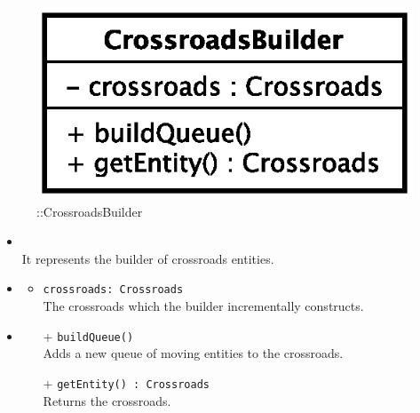 \begin{figure}[h]
\centering
\includegraphics[scale=0.6,keepaspectratio]{images/solution/app/backend/crossroads_builder.eps}
\caption{\pReactiveBuild::CrossroadsBuilder}
\label{fig:sd-app-crossroads_builder}
\end{figure}
\FloatBarrier
\begin{itemize}
  \item \textbf{\descr} \\
    It represents the builder of crossroads entities. 
    \item \textbf{\attrs}
  \begin{itemize}
    \item \texttt{crossroads: Crossroads} \\
The crossroads which the builder incrementally constructs.
  \end{itemize}
  \item \textbf{\ops}
  \begin{itemize} 
    \item[+] \texttt{buildQueue()} \\
Adds a new queue of moving entities to the crossroads.
    \item[+] \texttt{getEntity() : Crossroads} \\
Returns the crossroads.
  \end{itemize}
\end{itemize}
